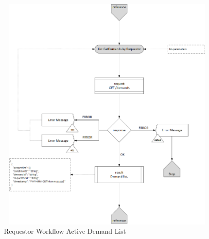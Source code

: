 \begin{enumerate}
\begin{figure}[htbp]
    \centering
    \includegraphics[width=12cm,height=12cm,angle=0]{./diag/Workflow/Market/List(GetDemands)-R-Workflow.png}
    \caption{Requestor Workflow Active Demand List }
	\label{fig:LD}
\end{figure}


\end{enumerate}

\newpage


